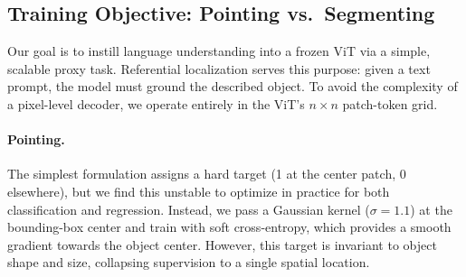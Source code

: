 \subsection{Training Objective: Pointing vs.\ Segmenting}
\label{app:training_signal}

Our goal is to instill language understanding into a frozen ViT via a simple, scalable proxy task.
Referential localization serves this purpose: given a text prompt, the model must 
ground the described object.
To avoid the complexity of a pixel-level decoder, we operate entirely in the ViT's $n \times n$ patch-token grid.


\paragraph{Pointing.}
The simplest formulation assigns a hard target (1 at the center patch, 0 elsewhere), but we find this unstable to optimize in practice for both classification and regression.
Instead, we pass a Gaussian kernel ($\sigma{=}1.1$) at the bounding-box center and train with soft cross-entropy, which provides a smooth gradient towards the object center.
However, this target is invariant to object shape and size, collapsing supervision to a single spatial location.

